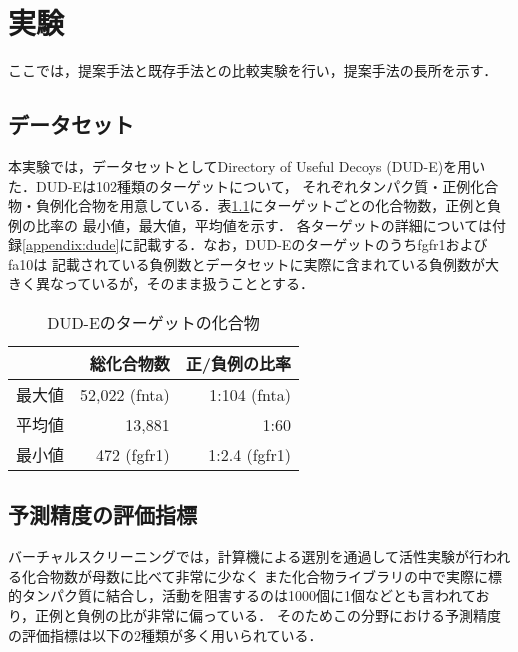 \chapter{実験}
ここでは，提案手法と既存手法との比較実験を行い，提案手法の長所を示す．


\section{データセット}
本実験では，データセットとしてDirectory of Useful Decoys (DUD-E)\cite{Mysinger2012}を用いた．DUD-Eは102種類のターゲットについて，
それぞれタンパク質・正例化合物・負例化合物を用意している．表\ref{table:dude}にターゲットごとの化合物数，正例と負例の比率の
最小値，最大値，平均値を示す．
各ターゲットの詳細については付録\ref{appendix:dude}に記載する．なお，DUD-Eのターゲットのうちfgfr1およびfa10は
記載されている負例数とデータセットに実際に含まれている負例数が大きく異なっているが，そのまま扱うこととする．

\begin{table}[htb] \centering
	\caption{DUD-Eのターゲットの化合物}
	\label {table:dude}
	\begin{tabular}{c|rr}
	\hline
			&総化合物数		&正/負例の比率	\\ \hline
	最大値	&52,022 (fnta)		&1:104 (fnta)		\\
	平均値	&13,881			&1:60			\\
	最小値	&472 (fgfr1)		&1:2.4 (fgfr1)		\\ \hline
	\end{tabular}
\end{table}

	
\section{予測精度の評価指標}
バーチャルスクリーニングでは，計算機による選別を通過して活性実験が行われる化合物数が母数に比べて非常に少なく
また化合物ライブラリの中で実際に標的タンパク質に結合し，活動を阻害するのは1000個に1個などとも言われており，正例と負例の比が非常に偏っている．
そのためこの分野における予測精度の評価指標は以下の2種類が多く用いられている．

